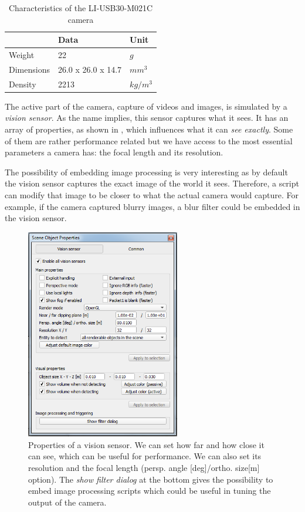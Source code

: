 \begin{table}[htp]
\center
\begin{tabularx}{\textwidth}{@{}X X X @{}}
\toprule
 & \textbf{Data} & \textbf{Unit}\\ 
\midrule
Weight & 22 & $g$\\
Dimensions & 26.0 x 26.0 x 14.7 & $mm^3$\\
Density & 2213 & $kg/m^3$\\
\bottomrule
\end{tabularx}
\caption[Characteristics of the LI-USB30-M021C camera]{Characteristics of the LI-USB30-M021C camera}
\label{table:cam_specs}
\end{table}

The active part of the camera, capture of videos and images, is simulated by a \emph{vision sensor}. As the name implies, this sensor captures what it sees. It has an array of properties, as shown in , which influences what it can \emph{see exactly}. Some of them are rather performance related but we have access to the most essential parameters a camera has: the focal length and its resolution.

The possibility of embedding image processing is very interesting as by default the vision sensor captures the exact image of the world it sees. Therefore, a script can modify that image to be closer to what the actual camera would capture. For example, if the camera captured blurry images, a blur filter could be embedded in the vision sensor.

\begin{figure}[htp]
\center
    \includegraphics[width = 0.6\textwidth]{figures/v-rep_camera}
    \caption[Settings of vision sensor]{Properties of a vision sensor. We can set how far and how close it can see, which can be useful for performance. We can also set its resolution and the focal length (persp. angle [deg]/ortho. size[m] option). The \emph{show filter dialog} at the bottom gives the possibility to embed image processing scripts which could be useful in tuning the output of the camera.}
    \label{fig:camera_model}
\end{figure}

